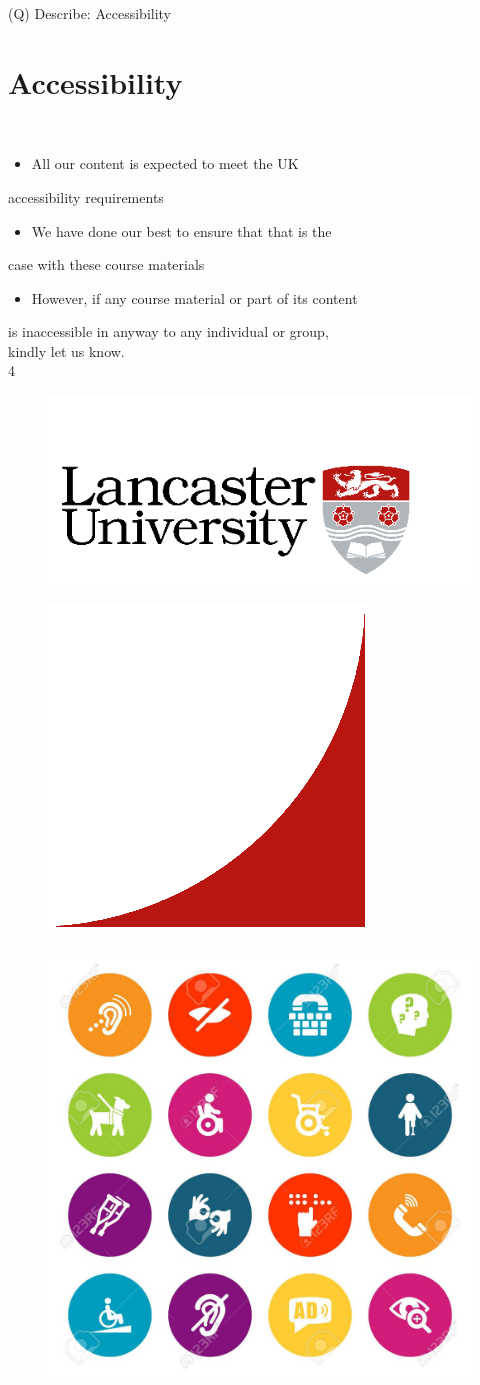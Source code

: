 \documentclass[12pt]{article}
\begin{document}
\clearpage
(Q)
Describe: Accessibility
\clearpage
\section{Accessibility}
\\
\begin{itemize}
  \item All our content is expected to meet the UK 
\end{itemize}
accessibility requirements\\
\begin{itemize}
  \item We have done our best to ensure that that is the 
\end{itemize}
case with these course materials\\
\begin{itemize}
  \item However, if any course material or part of its content 
\end{itemize}
is inaccessible in anyway to any individual or group, \\
kindly let us know.\\
4\\
\begin{figure}[H]
\includegraphics[width=0.5\linewidth]{page4-image-1.png}
\end{figure}
\begin{figure}[H]
\includegraphics[width=0.5\linewidth]{page4-image-2.png}
\end{figure}
\begin{figure}[H]
\includegraphics[width=0.5\linewidth]{page4-image-3.png}
\end{figure}
\end{document}
